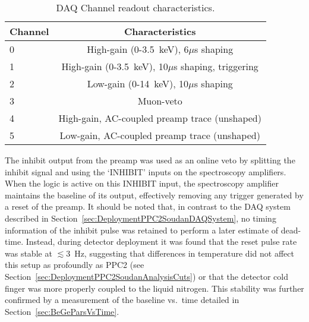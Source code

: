 	\begin{table}
		\centering
		\begin{tabular}{l c}
			\toprule
			Channel & Characteristics \\
			\midrule
			0 & High-gain (0-3.5~keV), 6$\mu$s shaping \\
			1 & High-gain (0-3.5~keV), 10$\mu$s shaping, triggering \\
			2 & Low-gain (0-14~keV), 10$\mu$s shaping \\
			3 & Muon-veto \\
			4 & High-gain, AC-coupled preamp trace (unshaped) \\
			5 & Low-gain, AC-coupled preamp trace (unshaped) \\
			\bottomrule
		\end{tabular}
		\caption[DAQ Channel readout characteristics]
		{DAQ Channel readout characteristics. }
		\label{tab:SoudanDAQTable}
	\end{table}

The inhibit output from the preamp was used as an online veto by splitting the inhibit signal and using the `INHIBIT' inputs on the spectroscopy amplifiers.  When the logic is active on this INHIBIT input, the spectroscopy amplifier maintains the baseline of its output, effectively removing any trigger generated by a reset of the preamp.  It should be noted that, in contrast to the DAQ system described in Section~\ref{sec:DeploymentPPC2SoudanDAQSystem}, no timing information of the inhibit pulse was retained to perform a later estimate of dead-time.  Instead, during detector deployment it was found that the reset pulse rate was stable at $\lesssim$3~Hz, suggesting that differences in temperature did not affect this setup as profoundly as PPC2 (see Section~\ref{sec:DeploymentPPC2SoudanAnalysisCuts}) or that the detector cold finger was more properly coupled to the liquid nitrogen.  This stability was further confirmed by a measurement of the baseline vs.~time detailed in Section~\ref{sec:BeGeParsVsTime}.%

